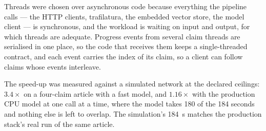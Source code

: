 Threads were chosen over asynchronous code because everything the
pipeline calls --- the HTTP clients, trafilatura, the embedded vector
store, the model client --- is synchronous, and the workload is waiting
on input and output, for which threads are adequate. Progress events
from several claim threads are serialised in one place, so the code that
receives them keeps a single-threaded contract, and each event carries
the index of its claim, so a client can follow claims whose events
interleave.

The speed-up was measured against a simulated network at the declared
ceilings: $3.4\times$ on a four-claim article with a fast model, and
$1.16\times$ with the production CPU model at one call at a time, where
the model takes 180 of the 184 seconds and nothing else is left to
overlap. The simulation's 184~s matches the production stack's real run
of the same article.
